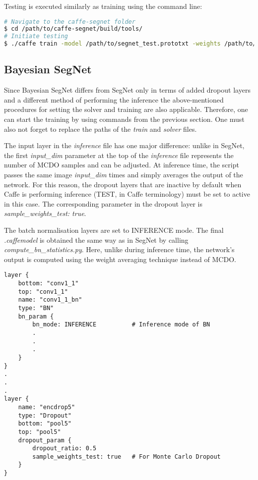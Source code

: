 Testing is executed similarly as training using the command line:

\begin{lstlisting}[language=bash]
# Navigate to the caffe-segnet folder
$ cd /path/to/caffe-segnet/build/tools/
# Initiate testing
$ ./caffe train -model /path/to/segnet_test.prototxt -weights /path/to/final_weights.caffemodel
\end{lstlisting}

\newpage
\subsection{Bayesian SegNet}

Since Bayesian SegNet differs from SegNet only in terms of added dropout layers and a different method of performing the inference the above-mentioned procedures for setting the solver and training are also applicable. Therefore, one can start the training by using commands from the previous section. One must also not forget to replace the paths of the \textit{train} and \textit{solver} files. 

The input layer in the \textit{inference} file has one major difference: unlike in SegNet, the first \textit{input\_dim} parameter at the top of the \textit{inference} file represents the number of MCDO samples and can be adjusted. At inference time, the script passes the same image \textit{input\_dim} times and simply averages the output of the network. For this reason, the dropout layers that are inactive by default when Caffe is performing inference (TEST, in Caffe terminology) must be set to active in this case. The corresponding parameter in the dropout layer is \textit{sample\_weights\_test: true}. 

The batch normalisation layers are set to INFERENCE mode. The final \textit{.caffemodel} is obtained the same way as in SegNet by calling \textit{compute\_bn\_statistics.py}. Here, unlike during inference time, the network's output is computed using the weight averaging technique instead of MCDO.

\begin{lstlisting}[caption={Setting MCDO in \textit{inference.prototxt} \cite{filip_github}},captionpos=b]
layer {
	bottom: "conv1_1"
	top: "conv1_1"
	name: "conv1_1_bn"
	type: "BN"
	bn_param {
		bn_mode: INFERENCE			# Inference mode of BN
		.
		.
		.
	}
}
.
.
.
layer {
	name: "encdrop5"
	type: "Dropout"
	bottom: "pool5"
	top: "pool5"
	dropout_param {
		dropout_ratio: 0.5
		sample_weights_test: true	# For Monte Carlo Dropout
	}
}
\end{lstlisting}

